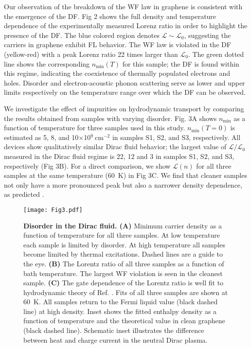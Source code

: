 \documentclass[10pt, oneside]{book}
\begin{document}
\begin{doublespace}
Our observation of the breakdown of the WF law in graphene is consistent with the emergence of the DF. Fig 2 shows the full density and temperature dependence of the experimentally measured Lorenz ratio in order to highlight the presence of the DF. The blue colored region denotes $\mathcal{L}\sim\mathcal{L}_0$, suggesting the carriers in graphene exhibit FL behavior. The WF law is violated in the DF (yellow-red) with a peak Lorenz ratio 22 times larger than $\mathcal{L}_0$. The green dotted line shows the corresponding $n_{\mathrm{min}}(T)$ for this sample; the DF is found within this regime, indicating the coexistence of thermally populated electrons and holes.    Disorder and electron-acoustic phonon scattering serve as lower and upper limits respectively on the temperature range over which the DF can be observed. \color{black}

We investigate the effect of impurities on hydrodynamic transport by comparing the results obtained from samples with varying disorder. Fig. 3A shows $n_{\mathrm{min}}$ as a function of temperature for three samples used in this study. $n_{\mathrm{min}}(T=0)$ is estimated as 5, 8, and 10$\times$10$^9~$cm$^{-2}$ in samples S1, S2, and S3, respectively. All devices show qualitatively similar Dirac fluid behavior; the largest value of $\mathcal{L}/\mathcal{L}_0$ measured in the Dirac fluid regime is 22, 12 and 3 in samples S1, S2, and S3, respectively (Fig 3B). For a direct comparison, we show $\mathcal{L}(n)$ for all three samples at the same temperature (60~K) in Fig 3C. We find that cleaner samples not only have a more pronounced peak but also a narrower density dependence, as predicted \cite{muller2, foster}.

\begin{figure}
\texttt{[image: Fig3.pdf]}
\caption{\textbf{Disorder in the Dirac fluid.  (A)} Minimum carrier density as a function of temperature for all three samples.  At low temperature each sample is limited by disorder. At high temperature all samples become limited by thermal excitations.  Dashed lines are a guide to the eye. \textbf{(B)} The Lorentz ratio of all three samples as a function of bath temperature. The largest WF violation is seen in the cleanest sample. \textbf{(C)} The gate dependence of the Lorentz ratio is well fit to hydrodynamic theory of Ref. \cite{muller2,foster}. Fits of all three samples are shown at 60~K. All samples return to the Fermi liquid value (black dashed line) at high density. Inset shows the fitted enthalpy density as a function of temperature and the theoretical value in clean graphene (black dashed line). Schematic inset illustrates the difference between heat and charge current in the neutral Dirac plasma.}
\label{Fig3}
\end{figure}


\end{doublespace}
\end{document}
